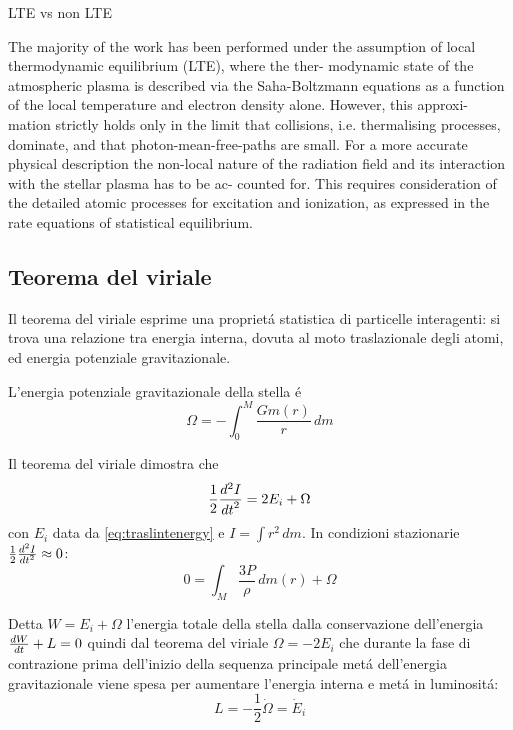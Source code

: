 \documentclass[../main.tex]{subfiles}
\begin{document}
\begin{workout}{LTE vs non LTE}

The majority of the work has been performed under the assumption of local thermodynamic equilibrium (LTE), where the ther- modynamic state of the atmospheric plasma is described via the Saha-Boltzmann equations as a function of the local temperature and electron density alone. However, this approxi- mation strictly holds only in the limit that collisions, i.e. thermalising processes, dominate, and that photon-mean-free-paths are small. For a more accurate physical description the non-local nature of the radiation field and its interaction with the stellar plasma has to be ac- counted for. This requires consideration of the detailed atomic processes for excitation and ionization, as expressed in the rate equations of statistical equilibrium.

\end{workout}

\subsection{Teorema del viriale}

Il teorema del viriale esprime una propriet\'a statistica di particelle interagenti: si trova una relazione tra energia interna, dovuta al moto traslazionale degli atomi, ed energia potenziale gravitazionale.

L'energia potenziale gravitazionale della stella \'e
\begin{equation}
\Omega=-\int_0^M\frac{Gm(r)}{r}\,dm\label{eq:energiapg}
\end{equation}

Il teorema del viriale dimostra che
\begin{equation}
\frac{1}{2}\TtwoDy{t}{I}=2E_i+\Omega
\end{equation}
con $E_i$ data da \eqref{eq:traslintenergy} e $I=\int r^2\,dm$. In condizioni stazionarie $\frac{1}{2}\TtwoDy{t}{I}\approx0$:
\begin{equation}
0=\int_M\frac{3P}{\rho}\,dm(r)+\Omega
\end{equation}

Detta $W=E_i+\Omega$ l'energia totale della stella dalla conservazione dell'energia $\TDy{t}{W}+L=0$ quindi dal teorema del viriale $\Omega=-2E_i$ che durante la fase di contrazione prima dell'inizio della sequenza principale met\'a dell'energia gravitazionale viene spesa per aumentare l'energia interna e met\'a in luminosit\'a:
\begin{equation}
L=-\frac{1}{2}\dot{\Omega}=\dot{E}_i
\end{equation}
\end{document}
